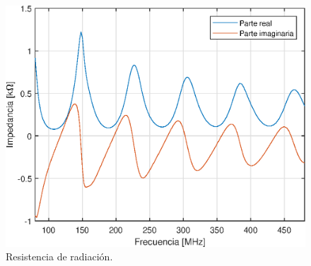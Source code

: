 \begin{figure}[H]
	\centering
	\includegraphics{imagenes/z_espacio_libre.eps}
	\caption{Resistencia de radiación.}
	\label{fig.z_radiacion}
\end{figure}
